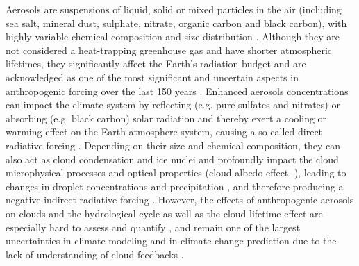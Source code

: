 \noindent 
Aerosols are  suspensions of liquid,  solid or mixed particles  in the
air  (including sea  salt,  mineral dust,  sulphate, nitrate,  organic
carbon and  black carbon),  with highly variable  chemical composition
and  size  distribution \citep{Putaud-2010}.   Although  they are  not
considered a heat-trapping greenhouse gas and have shorter atmospheric
lifetimes, they significantly affect  the Earth's radiation budget and
are acknowledged as one of  the most significant and uncertain aspects
in  anthropogenic forcing  over the  last 150  years \citep{Koch-2009,
IPCC-2013}.  Enhanced  aerosols concentrations can  impact the climate
system by  reflecting (e.g.  pure sulfates and  nitrates) or absorbing
(e.g.  black  carbon) solar radiation  and thereby exert a  cooling or
warming  effect on  the Earth-atmosphere  system, causing  a so-called
direct    radiative   forcing    \citep{Charlson-1991,   Haywood-2000,
Ramanathan-2001,  Liao-2005, Bangert-2012,  Lundgren-2013}.  Depending
on their  size and  chemical composition, they  can also act  as cloud
condensation  and   ice  nuclei   and  profoundly  impact   the  cloud
microphysical   processes  and   optical   properties  (cloud   albedo
effect,   \citealp{Twomey-1977}),  leading   to  changes   in  droplet
concentrations                \citep{Albrecht-1989}                and
precipitation   \citep{Rosenfeld-2000,   Khain-2008,  Pruppacher-2010,
Seifert-2012, Tao-2012, Lee-2012},  and therefore producing a negative
indirect   radiative    forcing   \citep{Haywood-2000,   Lohmann-2005,
VandenHeever-2011,   Rosenfeld-2013}.    However,   the   effects   of
anthropogenic aerosols on clouds and the hydrological cycle as well as
the  cloud   lifetime  effect  are  especially  hard   to  assess  and
quantify   \citep{IPCC-2013},   and   remain   one  of   the   largest
uncertainties in climate modeling and in climate change prediction due
to the lack of  understanding of cloud feedbacks \citep{Sherwood-2013,
Rosenfeld-2013, Lee-2013}. \\

